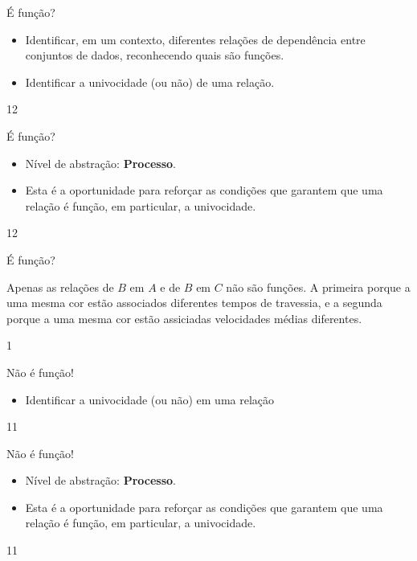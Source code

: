 \begin{objectives}{É função?}
{
\begin{itemize}

\item Identificar, em um contexto, diferentes relações de dependência entre conjuntos de dados, reconhecendo quais são funções.

\item Identificar a univocidade (ou não) de uma relação.

\end{itemize}
}{1}{2}
\end{objectives}
\begin{sugestions}{É função?}
{
\begin{itemize}
\item Nível de abstração: \textbf{Processo}.

\item Esta é a oportunidade para reforçar as condições que garantem que uma relação é função, em particular, a univocidade.
\end{itemize}
}{1}{2}
\end{sugestions}
\begin{answer}{É função?}
{
Apenas as relações de $B$ em $A$ e de $B$ em $C$ não são funções. A primeira porque a uma mesma cor estão associados diferentes tempos de travessia, e a segunda porque a uma mesma cor estão assiciadas velocidades médias diferentes.

}{1}
\end{answer}
\clearmargin
\begin{objectives}{Não é função!}
{
\begin{itemize}

\item Identificar a univocidade (ou não) em uma relação

\end{itemize}
}{1}{1}
\end{objectives}
\marginpar{\vspace{-2em}}
\begin{sugestions}{Não é função!}
{
\begin{itemize}
\item Nível de abstração: \textbf{Processo}.

\item Esta é a oportunidade para reforçar as condições que garantem que uma relação é função, em particular, a univocidade.
\end{itemize}
}{1}{1}
\end{sugestions}
